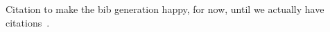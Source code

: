 
Citation to make the bib generation happy, for now, until we actually have citations~\cite{Eucalyptus}.

